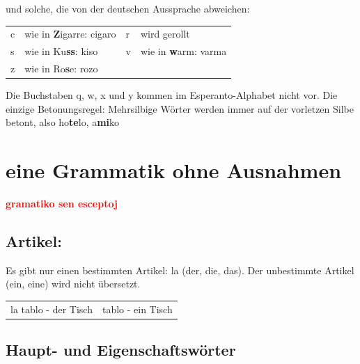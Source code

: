 \documentclass{leaflet}
\begin{document}
und solche, die von der deutschen Aussprache abweichen:

\begin{tabular}{llll}
c& wie in \textbf{Z}igarre: cigaro&
r& wird gerollt\\
s& wie in Ku\textbf{ss}: kiso&
v& wie in \textbf{w}arm: varma\\
z& wie in Ro\textbf{s}e: rozo& &\\
\end{tabular}

Die Buchstaben q, w, x und y kommen im Esperanto-Alphabet nicht vor.
Die einzige Betonungsregel: Mehrsilbige Wörter werden immer auf der vorletzen Silbe betont, also ho\textbf{te}lo, a\textbf{mi}ko
\clearpage

\vspace{-.6cm}

\section{eine Grammatik ohne Ausnahmen}

\vspace{-.2cm}

\begin{flushright}
\textbf{\large \textcolor{red}{gramatiko sen esceptoj}}
\end{flushright}

\vspace{-.7cm}

\subsection{Artikel:}

\vspace{-.2cm}

Es gibt nur einen bestimmten Artikel: la (der, die, das). Der unbestimmte Artikel (ein, eine) wird nicht übersetzt.

\begin{tabular}{ll}
la tablo - der Tisch  & tablo - ein Tisch
\end{tabular}

\vspace{-.3cm}

\subsection{Haupt- und Eigenschaftswörter}

\vspace{-.1cm}
\end{document}
